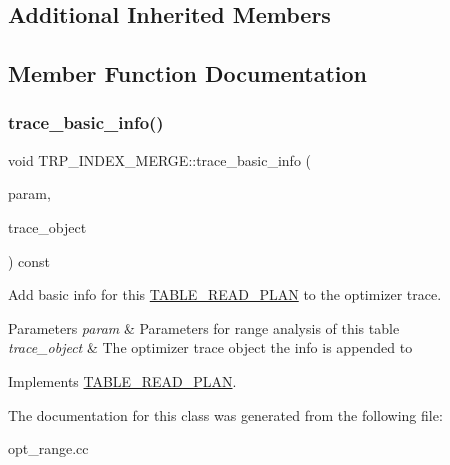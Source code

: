 \subsection*{Additional Inherited Members}


\subsection{Member Function Documentation}
\mbox{\label{classTRP__INDEX__MERGE_a2d384b4469b8be6dc5c246f7d5ad4307}} 
\subsubsection{\texorpdfstring{trace\+\_\+basic\+\_\+info()}{trace\_basic\_info()}}
{\footnotesize\ttfamily void T\+R\+P\+\_\+\+I\+N\+D\+E\+X\+\_\+\+M\+E\+R\+G\+E\+::trace\+\_\+basic\+\_\+info (\begin{DoxyParamCaption}\item[{const \mbox{\hyperlink{classPARAM}{P\+A\+R\+AM}} $\ast$}]{param,  }\item[{\mbox{\hyperlink{classOpt__trace__object}{Opt\+\_\+trace\+\_\+object}} $\ast$}]{trace\+\_\+object }\end{DoxyParamCaption}) const\hspace{0.3cm}{\ttfamily [virtual]}}

Add basic info for this \mbox{\hyperlink{classTABLE__READ__PLAN}{T\+A\+B\+L\+E\+\_\+\+R\+E\+A\+D\+\_\+\+P\+L\+AN}} to the optimizer trace.


\begin{DoxyParams}{Parameters}
{\em param} & Parameters for range analysis of this table \\
\hline
{\em trace\+\_\+object} & The optimizer trace object the info is appended to \\
\hline
\end{DoxyParams}


Implements \mbox{\hyperlink{classTABLE__READ__PLAN_a35e1758c9edce0c8bea19a602409f861}{T\+A\+B\+L\+E\+\_\+\+R\+E\+A\+D\+\_\+\+P\+L\+AN}}.



The documentation for this class was generated from the following file\+:\begin{DoxyCompactItemize}
\item 
opt\+\_\+range.\+cc\end{DoxyCompactItemize}
